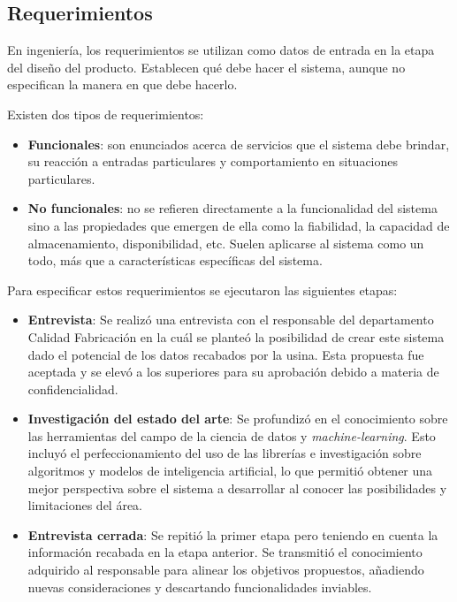 \documentclass[a4paper,12pt]{article}
\begin{document}
\clearpage

\subsection{Requerimientos}
En ingeniería, los requerimientos se utilizan como datos de entrada en la etapa del diseño del producto. Establecen qué debe hacer el sistema, aunque no especifican la manera en que debe hacerlo. \citep{sommerville2015software}

Existen dos tipos de requerimientos:
\begin{itemize}[noitemsep, topsep=2pt]
	\item \textbf{Funcionales}: son enunciados acerca de servicios que el sistema debe brindar, su reacción a entradas particulares y comportamiento en situaciones particulares.
	\item \textbf{No funcionales}: no se refieren directamente a la funcionalidad del sistema sino a las propiedades que emergen de ella como la fiabilidad, la capacidad de almacenamiento, disponibilidad, etc. Suelen aplicarse al sistema como un todo, más que a características específicas del sistema.
\end{itemize}

\vspace{0.3cm}

Para especificar estos requerimientos se ejecutaron las siguientes etapas:
\begin{itemize}[topsep=2pt]
	\item \textbf{Entrevista}:  Se realizó una entrevista con el responsable del departamento Calidad Fabricación en la cuál se planteó la posibilidad de crear este sistema dado el potencial de los datos recabados por la usina. Esta propuesta fue aceptada y se elevó a los superiores para su aprobación debido a materia de confidencialidad.
	\item \textbf{Investigación del estado del arte}: Se profundizó en el conocimiento sobre las herramientas del campo de la ciencia de datos y \textit{machine-learning}. Esto incluyó el perfeccionamiento del uso de las librerías e investigación sobre algoritmos y modelos de inteligencia artificial, lo que permitió obtener una mejor perspectiva sobre el sistema a desarrollar al conocer las posibilidades y limitaciones del área.
	\item \textbf{Entrevista cerrada}: Se repitió la primer etapa pero teniendo en cuenta la información recabada en la etapa anterior. Se transmitió el conocimiento adquirido al responsable para alinear los objetivos propuestos, añadiendo nuevas consideraciones y descartando funcionalidades inviables.
\end{itemize}
\end{document}
